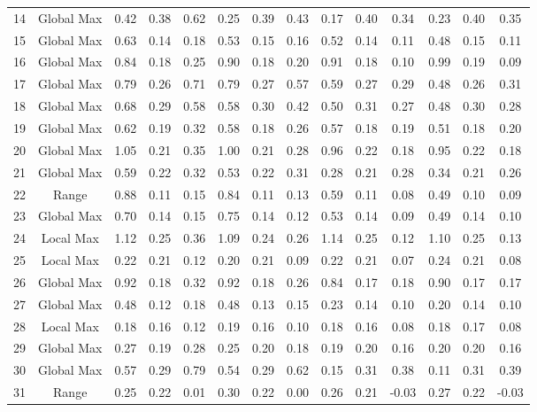 \documentclass[11pt,a4paper]{article}
\begin{document}
\begin{table}[ht]
{\begin{tabular}{@{\extracolsep{4pt}}cccccccccccccc}
  14 & Global Max & 0.42 & 0.38 & 0.62 & 0.25 & 0.39 & 0.43 & 0.17 & 0.40 & 0.34 & 0.23 & 0.40 & 0.35 \\ 
  15 & Global Max & 0.63 & 0.14 & 0.18 & 0.53 & 0.15 & 0.16 & 0.52 & 0.14 & 0.11 & 0.48 & 0.15 & 0.11 \\ 
  16 & Global Max & 0.84 & 0.18 & 0.25 & 0.90 & 0.18 & 0.20 & 0.91 & 0.18 & 0.10 & 0.99 & 0.19 & 0.09 \\ 
  17 & Global Max & 0.79 & 0.26 & 0.71 & 0.79 & 0.27 & 0.57 & 0.59 & 0.27 & 0.29 & 0.48 & 0.26 & 0.31 \\ 
  18 & Global Max & 0.68 & 0.29 & 0.58 & 0.58 & 0.30 & 0.42 & 0.50 & 0.31 & 0.27 & 0.48 & 0.30 & 0.28 \\ 
  19 & Global Max & 0.62 & 0.19 & 0.32 & 0.58 & 0.18 & 0.26 & 0.57 & 0.18 & 0.19 & 0.51 & 0.18 & 0.20 \\ 
  20 & Global Max & 1.05 & 0.21 & 0.35 & 1.00 & 0.21 & 0.28 & 0.96 & 0.22 & 0.18 & 0.95 & 0.22 & 0.18 \\ 
  21 & Global Max & 0.59 & 0.22 & 0.32 & 0.53 & 0.22 & 0.31 & 0.28 & 0.21 & 0.28 & 0.34 & 0.21 & 0.26 \\ 
  22 & Range & 0.88 & 0.11 & 0.15 & 0.84 & 0.11 & 0.13 & 0.59 & 0.11 & 0.08 & 0.49 & 0.10 & 0.09 \\ 
  23 & Global Max & 0.70 & 0.14 & 0.15 & 0.75 & 0.14 & 0.12 & 0.53 & 0.14 & 0.09 & 0.49 & 0.14 & 0.10 \\ 
  24 & Local Max & 1.12 & 0.25 & 0.36 & 1.09 & 0.24 & 0.26 & 1.14 & 0.25 & 0.12 & 1.10 & 0.25 & 0.13 \\ 
  25 & Local Max & 0.22 & 0.21 & 0.12 & 0.20 & 0.21 & 0.09 & 0.22 & 0.21 & 0.07 & 0.24 & 0.21 & 0.08 \\ 
  26 & Global Max & 0.92 & 0.18 & 0.32 & 0.92 & 0.18 & 0.26 & 0.84 & 0.17 & 0.18 & 0.90 & 0.17 & 0.17 \\ 
  27 & Global Max & 0.48 & 0.12 & 0.18 & 0.48 & 0.13 & 0.15 & 0.23 & 0.14 & 0.10 & 0.20 & 0.14 & 0.10 \\ 
  28 & Local Max & 0.18 & 0.16 & 0.12 & 0.19 & 0.16 & 0.10 & 0.18 & 0.16 & 0.08 & 0.18 & 0.17 & 0.08 \\ 
  29 & Global Max & 0.27 & 0.19 & 0.28 & 0.25 & 0.20 & 0.18 & 0.19 & 0.20 & 0.16 & 0.20 & 0.20 & 0.16 \\ 
  30 & Global Max & 0.57 & 0.29 & 0.79 & 0.54 & 0.29 & 0.62 & 0.15 & 0.31 & 0.38 & 0.11 & 0.31 & 0.39 \\ 
  31 & Range & 0.25 & 0.22 & 0.01 & 0.30 & 0.22 & 0.00 & 0.26 & 0.21 & -0.03 & 0.27 & 0.22 & -0.03 \\ 

\end{tabular}}
\end{table}
\end{document}
